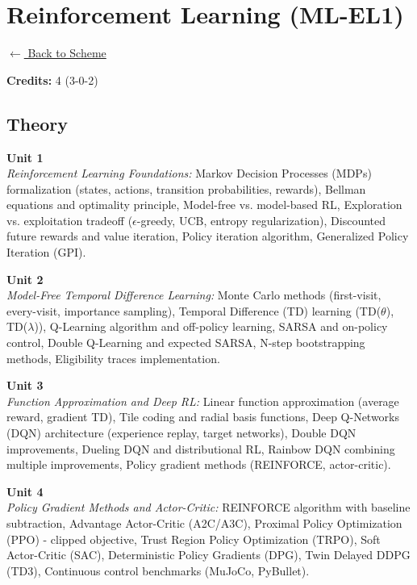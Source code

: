 \section*{Reinforcement Learning (ML-EL1)}
\label{elec:ML_1}

\noindent \small{\hyperref[main:scheme]{$\leftarrow$ Back to Scheme}} \vspace{0.5cm}

\noindent \textbf{Credits:} 4 (3-0-2)

\subsection*{Theory}
\noindent\textbf{Unit 1} \\
\textit{Reinforcement Learning Foundations:} Markov Decision Processes (MDPs) formalization (states, actions, transition probabilities, rewards), Bellman equations and optimality principle, Model-free vs. model-based RL, Exploration vs. exploitation tradeoff ($\epsilon$-greedy, UCB, entropy regularization), Discounted future rewards and value iteration, Policy iteration algorithm, Generalized Policy Iteration (GPI).

\vspace{0.3cm}

\noindent\textbf{Unit 2} \\
\textit{Model-Free Temporal Difference Learning:} Monte Carlo methods (first-visit, every-visit, importance sampling), Temporal Difference (TD) learning (TD($\theta$), TD($\lambda$)), Q-Learning algorithm and off-policy learning, SARSA and on-policy control, Double Q-Learning and expected SARSA, N-step bootstrapping methods, Eligibility traces implementation.

\vspace{0.3cm}

\noindent\textbf{Unit 3} \\
\textit{Function Approximation and Deep RL:} Linear function approximation (average reward, gradient TD), Tile coding and radial basis functions, Deep Q-Networks (DQN) architecture (experience replay, target networks), Double DQN improvements, Dueling DQN and distributional RL, Rainbow DQN combining multiple improvements, Policy gradient methods (REINFORCE, actor-critic).

\vspace{0.3cm}

\noindent\textbf{Unit 4} \\
\textit{Policy Gradient Methods and Actor-Critic:} REINFORCE algorithm with baseline subtraction, Advantage Actor-Critic (A2C/A3C), Proximal Policy Optimization (PPO) - clipped objective, Trust Region Policy Optimization (TRPO), Soft Actor-Critic (SAC), Deterministic Policy Gradients (DPG), Twin Delayed DDPG (TD3), Continuous control benchmarks (MuJoCo, PyBullet).

